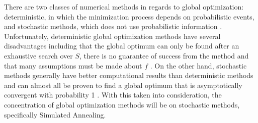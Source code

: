 There are two classes of numerical methods in regards to global optimization: deterministic, in which the minimization process depends on probabilistic events, and stochastic methods, which does not use probabilistic information \cite{dekkers}. Unfortunately, deterministic global optimization methods have several disadvantages including that the global optimum can only be found after an exhaustive search over $S$, there is no guarantee of success from the method and that many assumptions must be made about $f$ \cite{dekkers}. On the other hand, stochastic methods generally have better computational results than deterministic methods and can almost all be proven to find a global optimum that is asymptotically convergent with probability 1 \cite{dekkers}. With this taken into consideration, the concentration of global optimization methods will be on stochastic methods, specifically Simulated Annealing. 



